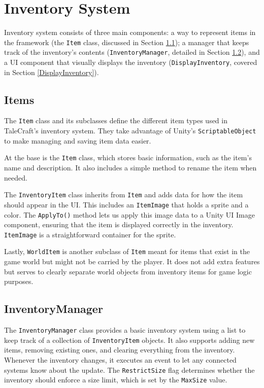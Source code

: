 \section{Inventory System}
\label{InventorySystem}
Inventory system consists of three main components: a way to represent items in the framework (the \verb|Item| class, discussed in Section \ref{Items}); a manager that keeps track of the inventory’s contents (\verb|InventoryManager|, detailed in Section \ref{InventoryManager}), and a UI component that visually displays the inventory (\verb|DisplayInventory|, covered in Section \ref{DisplayInventory}). 

\subsection{Items}
\label{Items}
The \verb|Item| class and its subclasses define the different item types used in TaleCraft’s inventory system. They take advantage of Unity’s \verb|ScriptableObject| to make managing and saving item data easier.

At the base is the \verb|Item| class, which stores basic information, such as the item’s name and description. It also includes a simple method to rename the item when needed.

The \verb|InventoryItem| class inherits from \verb|Item| and adds data for how the item should appear in the UI. This includes an \verb|ItemImage| that holds a sprite and a color. The \verb|ApplyTo()| method lets us apply this image data to a Unity UI Image component, ensuring that the item is displayed correctly in the inventory. \verb|ItemImage| is a straightforward container for the sprite.

Lastly, \verb|WorldItem| is another subclass of \verb|Item| meant for items that exist in the game world but might not be carried by the player. It does not add extra features but serves to clearly separate world objects from inventory items for game logic purposes.
 
\subsection{InventoryManager}
\label{InventoryManager}
The \verb|InventoryManager| class provides a basic inventory system using a list to keep track of a collection of \verb|InventoryItem| objects. It also supports adding new items, removing existing ones, and clearing everything from the inventory. Whenever the inventory changes, it executes an event to let any connected systems know about the update. The \verb|RestrictSize| flag determines whether the inventory should enforce a size limit, which is set by the \verb|MaxSize| value.

